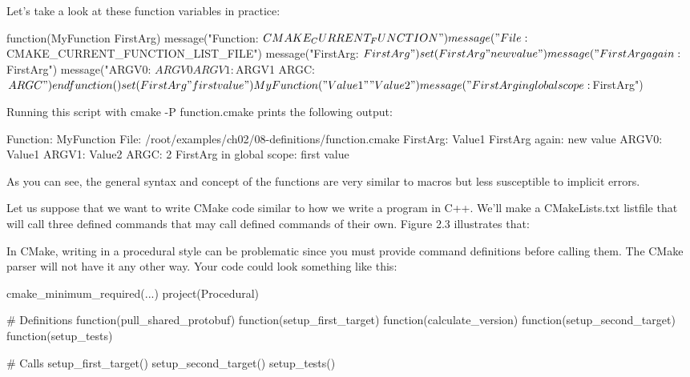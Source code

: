 Let’s take a look at these function variables in practice:


\begin{cmake}
function(MyFunction FirstArg)
    message("Function: ${CMAKE_CURRENT_FUNCTION}")
    message("File: ${CMAKE_CURRENT_FUNCTION_LIST_FILE}")
    message("FirstArg: ${FirstArg}")
    set(FirstArg "new value")
    message("FirstArg again: ${FirstArg}")
    message("ARGV0: ${ARGV0} ARGV1: ${ARGV1} ARGC: ${ARGC}")
endfunction()
set(FirstArg "first value")
MyFunction("Value1" "Value2")
message("FirstArg in global scope: ${FirstArg}")
\end{cmake}

Running this script with cmake -P function.cmake prints the following output:

\begin{shell}
Function: MyFunction
File: /root/examples/ch02/08-definitions/function.cmake
FirstArg: Value1
FirstArg again: new value
ARGV0: Value1 ARGV1: Value2 ARGC: 2
FirstArg in global scope: first value
\end{shell}

As you can see, the general syntax and concept of the functions are very similar to macros but less susceptible to implicit errors.


Let us suppose that we want to write CMake code similar to how we write a program in C++. We’ll make a CMakeLists.txt listfile that will call three defined commands that may call defined commands of their own. Figure 2.3 illustrates that:


In CMake, writing in a procedural style can be problematic since you must provide command definitions before calling them. The CMake parser will not have it any other way. Your code could look something like this:

\begin{cmake}
cmake_minimum_required(...)
project(Procedural)

# Definitions
function(pull_shared_protobuf)
function(setup_first_target)
function(calculate_version)
function(setup_second_target)
function(setup_tests)

# Calls
setup_first_target()
setup_second_target()
setup_tests()
\end{cmake}

